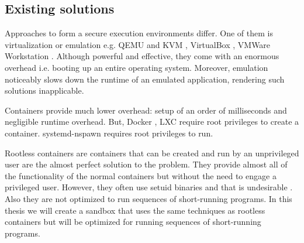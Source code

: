 \documentclass[en]{pracamgr}
\begin{document}
\subsection{Existing solutions}

Approaches to form a secure execution environments differ. One of them is virtualization or emulation e.g. QEMU \cite{qemu_website} and KVM \cite{kvm_website}, VirtualBox \cite{virtualbox_website}, VMWare Workstation \cite{vmware_workstation_website}. Although powerful and effective, they come with an enormous overhead i.e. booting up an entire operating system. Moreover, emulation noticeably slows down the runtime of an emulated application, rendering such solutions inapplicable.

Containers provide much lower overhead: setup of an order of milliseconds and negligible runtime overhead. But, Docker \cite{Merkel:2014:DLL:2600239.2600241}, LXC \cite{conf/cisis/BeserraMEBSF15} require root privileges to create a container. systemd-nspawn \cite{systemd_nspawn} requires root privileges to run.

Rootless containers are containers \cite{rootless_containers_rs} that can be created and run by an unprivileged user are the almost perfect solution to the problem. They provide almost all of the functionality of the normal containers but without the need to engage a privileged user. However, they often use setuid binaries and that is undesirable \cite{podman_rootless_containers_presentation}. Also they are not optimized to run sequences of short-running programs. In this thesis we will create a sandbox that uses the same techniques as rootless containers but will be optimized for running sequences of short-running programs.




\end{document}
